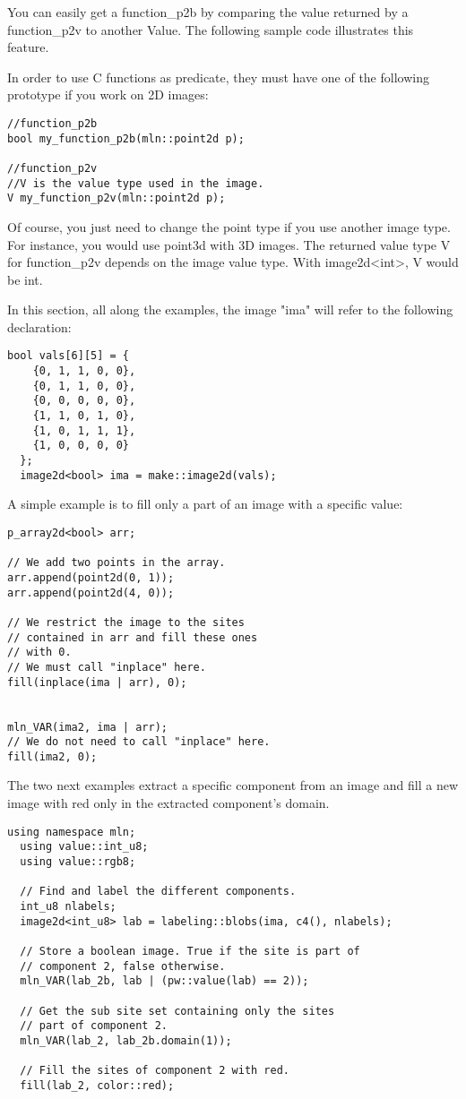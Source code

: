\documentclass{report}
\begin{document}
You can easily get a function\_p2b by comparing the value returned 
by a function\_p2v to another Value.
The following sample code illustrates this feature.

In order to use C functions as predicate, they must have one of the following
prototype if you work on 2D images:
\begin{lstlisting}[frame=single]
//function_p2b
bool my_function_p2b(mln::point2d p);

//function_p2v
//V is the value type used in the image.
V my_function_p2v(mln::point2d p);
\end{lstlisting}
Of course, you just need to change the point type if you use another image
type. For instance, you would use point3d with 3D images.
The returned value type V for function\_p2v depends on the image value type.
With image2d<int>, V would be int.

In this section, all along the examples, the image "ima" will refer to the
following declaration:
\begin{lstlisting}[frame=single]
  bool vals[6][5] = {
    {0, 1, 1, 0, 0},
    {0, 1, 1, 0, 0},
    {0, 0, 0, 0, 0},
    {1, 1, 0, 1, 0},
    {1, 0, 1, 1, 1},
    {1, 0, 0, 0, 0}
  };
  image2d<bool> ima = make::image2d(vals);
\end{lstlisting}

A simple example is to fill only a part of an image with a specific value:
\begin{lstlisting}[frame=single]
p_array2d<bool> arr;

// We add two points in the array.
arr.append(point2d(0, 1));
arr.append(point2d(4, 0));

// We restrict the image to the sites
// contained in arr and fill these ones
// with 0.
// We must call "inplace" here.
fill(inplace(ima | arr), 0);


mln_VAR(ima2, ima | arr);
// We do not need to call "inplace" here.
fill(ima2, 0);
\end{lstlisting}

The two next examples extract a specific component from an image and fill a new
image with red only in the extracted component's domain.
\begin{lstlisting}[frame=single]
  using namespace mln;
  using value::int_u8;
  using value::rgb8;

  // Find and label the different components.
  int_u8 nlabels;
  image2d<int_u8> lab = labeling::blobs(ima, c4(), nlabels);

  // Store a boolean image. True if the site is part of
  // component 2, false otherwise.
  mln_VAR(lab_2b, lab | (pw::value(lab) == 2));

  // Get the sub site set containing only the sites
  // part of component 2.
  mln_VAR(lab_2, lab_2b.domain(1));

  // Fill the sites of component 2 with red.
  fill(lab_2, color::red);
\end{lstlisting}
\end{document}
